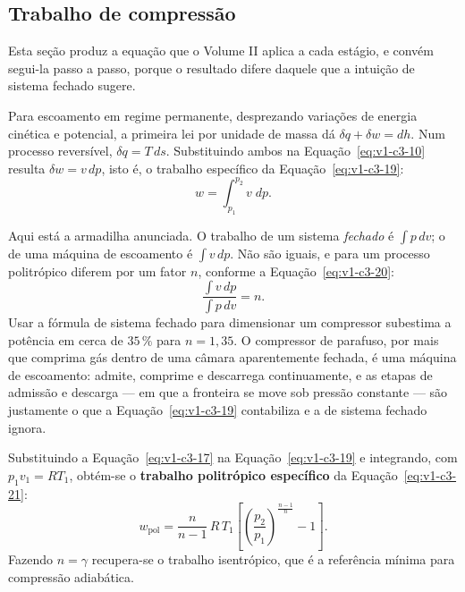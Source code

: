 \documentclass[12pt,a4paper]{article}
\numberwithin{equation}{section}
\numberwithin{table}{section}
\numberwithin{figure}{section}
\begin{document}
\subsection{Trabalho de compressão}\label{sub:v1-c3-trabalho}

Esta seção produz a equação que o Volume II aplica a cada estágio, e convém
segui-la passo a passo, porque o resultado difere daquele que a intuição de
sistema fechado sugere.

Para escoamento em regime permanente, desprezando variações de energia cinética
e potencial, a primeira lei por unidade de massa dá $\delta q + \delta w = dh$.
Num processo reversível, $\delta q = T\,ds$. Substituindo ambos na
Equação~\eqref{eq:v1-c3-10} resulta $\delta w = v\,dp$, isto é, o trabalho
específico da Equação~\eqref{eq:v1-c3-19}:
\begin{equation}\label{eq:v1-c3-19}
w = \int_{p_1}^{p_2} v \; dp .
\end{equation}

Aqui está a armadilha anunciada. O trabalho de um sistema \emph{fechado} é
$\int p\,dv$; o de uma máquina de escoamento é $\int v\,dp$. Não são iguais, e
para um processo politrópico diferem por um fator $n$, conforme a
Equação~\eqref{eq:v1-c3-20}:
\begin{equation}\label{eq:v1-c3-20}
\frac{\int v\,dp}{\int p\,dv} = n .
\end{equation}
Usar a fórmula de sistema fechado para dimensionar um compressor subestima a
potência em cerca de $35\,\%$ para $n = 1{,}35$. O compressor de parafuso, por
mais que comprima gás dentro de uma câmara aparentemente fechada, é uma máquina
de escoamento: admite, comprime e descarrega continuamente, e as etapas de
admissão e descarga --- em que a fronteira se move sob pressão constante ---
são justamente o que a Equação~\eqref{eq:v1-c3-19} contabiliza e a de sistema
fechado ignora.

Substituindo a Equação~\eqref{eq:v1-c3-17} na Equação~\eqref{eq:v1-c3-19} e
integrando, com $p_1v_1 = RT_1$, obtém-se o \textbf{trabalho politrópico
específico} da Equação~\eqref{eq:v1-c3-21}:
\begin{equation}\label{eq:v1-c3-21}
w_{\text{pol}} = \frac{n}{n-1}\,R\,T_1
\left[ \left(\frac{p_2}{p_1}\right)^{\frac{n-1}{n}} - 1 \right] .
\end{equation}
Fazendo $n = \gamma$ recupera-se o trabalho isentrópico, que é a referência
mínima para compressão adiabática.
\end{document}
